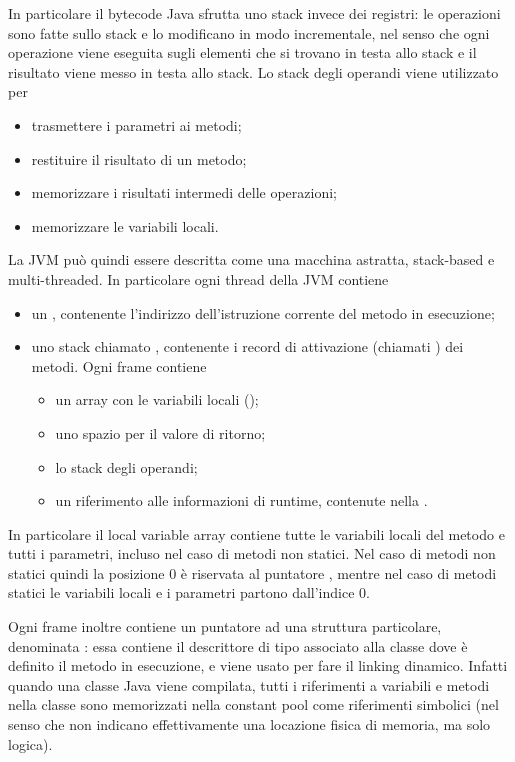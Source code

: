 In particolare il bytecode Java sfrutta uno stack invece dei registri: le operazioni sono fatte sullo stack e lo modificano in modo incrementale, nel senso che ogni operazione viene eseguita sugli elementi che si trovano in testa allo stack e il risultato viene messo in testa allo stack. Lo stack degli operandi viene utilizzato per \begin{itemize}
    \item trasmettere i parametri ai metodi;
    \item restituire il risultato di un metodo;
    \item memorizzare i risultati intermedi delle operazioni;
    \item memorizzare le variabili locali.
\end{itemize}

La JVM può quindi essere descritta come una macchina astratta, stack-based e multi-threaded. In particolare ogni thread della JVM contiene \begin{itemize}
    \item un , contenente l'indirizzo dell'istruzione corrente del metodo in esecuzione;
    \item uno stack chiamato , contenente i record di attivazione (chiamati ) dei metodi. Ogni frame contiene \begin{itemize}
        \item un array con le variabili locali ();
        \item uno spazio per il valore di ritorno;
        \item lo stack degli operandi;
        \item un riferimento alle informazioni di runtime, contenute nella .
    \end{itemize}
\end{itemize} In particolare il local variable array contiene tutte le variabili locali del metodo e tutti i parametri, incluso  nel caso di metodi non statici. Nel caso di metodi non statici quindi la posizione $0$ è riservata al puntatore , mentre nel caso di metodi statici le variabili locali e i parametri partono dall'indice $0$.

Ogni frame inoltre contiene un puntatore ad una struttura particolare, denominata : essa contiene il descrittore di tipo associato alla classe dove è definito il metodo in esecuzione, e viene usato per fare il linking dinamico. Infatti quando una classe Java viene compilata, tutti i riferimenti a variabili e metodi nella classe sono memorizzati nella constant pool come riferimenti simbolici (nel senso che non indicano effettivamente una locazione fisica di memoria, ma solo logica).

